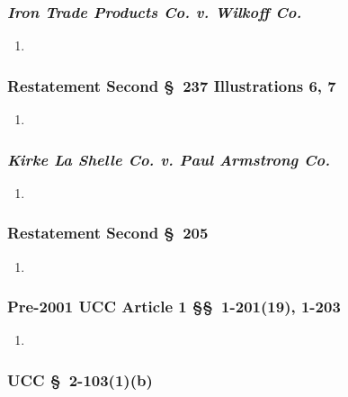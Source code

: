 \subsubsection{\emph{Iron Trade Products Co. v. Wilkoff Co.}}

\begin{enumerate}
    \item %
\end{enumerate}

\subsubsection{Restatement Second \S\ 237 Illustrations 6, 7}

\begin{enumerate}
    \item %
\end{enumerate}

\subsubsection{\emph{Kirke La Shelle Co. v. Paul Armstrong Co.}}

\begin{enumerate}
    \item %
\end{enumerate}

\subsubsection{Restatement Second \S\ 205}

\begin{enumerate}
    \item %
\end{enumerate}

\subsubsection{Pre-2001 UCC Article 1 \S\S\ 1-201(19), 1-203}

\begin{enumerate}
    \item %
\end{enumerate}

\subsubsection{UCC \S\ 2-103(1)(b)}

